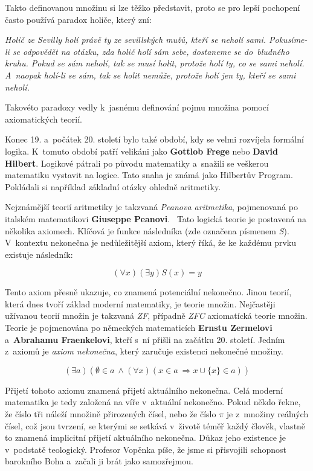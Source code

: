 \documentclass[czech]{article}
\begin{document}
Takto definovanou množinu si lze těžko představit, proto se pro lepší pochopení často používá paradox holiče, který zní:

\begin{flushleft}
\textit{Holič ze Sevilly holí právě ty ze sevillských mužů, kteří se neholí sami. Pokusíme-li se odpovědět na otázku, zda holič holí sám sebe, dostaneme se do~bludného kruhu. Pokud se sám neholí, tak se musí holit, protože holí ty, co se sami neholí. A~naopak holí-li se sám, tak se holit nemůže, protože holí jen ty, kteří se sami neholí.}
\end{flushleft}

Takovéto paradoxy vedly k~jasnému definování pojmu množina pomocí axiomatických teorií.

Konec 19. a~počátek 20. století bylo také období, kdy se velmi rozvíjela formální logika. K~tomuto období patří velikáni jako \textbf{Gottlob Frege} nebo \textbf{David Hilbert}. Logikové pátrali po původu matematiky a~snažili se veškerou matematiku vystavit na logice. Tato snaha je známá jako Hilbertův Program.~\cite{hilbert_program} Pokládali si například základní otázky ohledně aritmetiky. 

Nejznámější teorií aritmetiky je takzvaná \textit{Peanova aritmetika}, pojmenovaná po italském matematikovi \textbf{Giuseppe Peanovi}.~\cite{peano}
Tato logická teorie je postavená na několika axiomech. Klíčová je funkce následníka (zde označena písmenem \textit{S}). V~kontextu nekonečna je nedůležitější axiom, který říká, že ke každému prvku existuje následník:

\[
(\forall x) (\exists y ) S(x) = y
\]

Tento axiom přesně ukazuje, co znamená potenciální nekonečno. Jinou teorií, která dnes tvoří základ moderní matematiky, je teorie množin. Nejčastěji užívanou teorií množin je takzvaná \textit{ZF}, případně \textit{ZFC} axiomatícká teorie množin. Teorie je pojmenována po německých matematicích \textbf{Ernstu Zermelovi} a~\textbf{Abrahamu Fraenkelovi}, kteří s~ní přišli na začátku 20. století. Jedním z~axiomů je \textit{axiom nekonečna}, který zaručuje existenci nekonečné množiny.

\[
(\exists a)(\emptyset \in a~\land (\forall x)(x \in a~\Longrightarrow x \cup \{ x \} \in a))
\]

Přijetí tohoto axiomu znamená přijetí aktuálního nekonečna.
Celá moderní matematika je tedy založená na víře v~aktuální nekonečno.
Pokud někdo řekne, že číslo tři náleží množině přirozených čísel, nebo že číslo $\pi$ je z~množiny reálných čísel, což jsou tvrzení, se kterými se setkává v~životě téměř každý člověk, vlastně to znamená implicitní přijetí aktuálního nekonečna. Důkaz jeho existence je v~podstatě teologický.
Profesor Vopěnka píše, že jsme si přisvojili schopnost barokního Boha a~začali ji brát jako samozřejmou.~\cite{vopenka}
\end{document}
